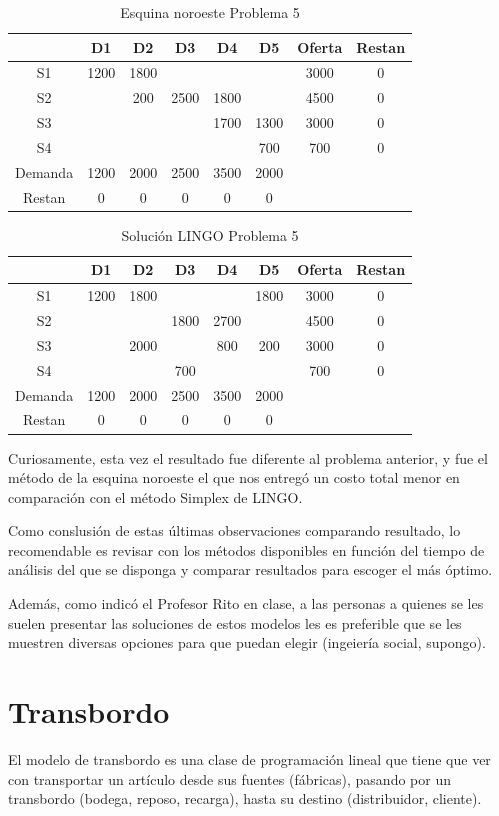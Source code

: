 \documentclass[12pt]{article}  %
\begin{document}
\begin{table}[H]
\centering
\caption{Esquina noroeste Problema 5}
\label{tab:esqNorEstProb5}
\begin{tabular}{c|ccccc|cc}
& D1 & D2 & D3 & D4 & D5 & Oferta & Restan\\
\hline
S1 & 1200 & 1800 &  &  &  & 3000 & 0 \\
S2 &  & 200 & 2500 & 1800 &  & 4500 & 0 \\
S3 &  &  &  & 1700 & 1300 & 3000 & 0 \\
S4 &  &  &  &  & 700 & 700 &0 \\
\hline
Demanda & 1200 & 2000 & 2500 & 3500 & 2000 & & \\
Restan & 0 & 0 & 0 & 0 & 0 &&
\end{tabular}
\end{table}

\begin{table}[H]
\centering
\caption{Solución LINGO Problema 5}
\label{tab:solLingoProb5}
\begin{tabular}{c|ccccc|cc}
& D1 & D2 & D3 & D4 & D5 & Oferta & Restan\\
\hline
S1 & 1200 & 1800 &  &  & 1800 & 3000 & 0 \\
S2 &  &  & 1800 & 2700 &  & 4500 & 0 \\
S3 &  & 2000 &  & 800 & 200 & 3000 & 0 \\
S4 &  &  & 700 &  &  & 700 &0 \\
\hline
Demanda & 1200 & 2000 & 2500 & 3500 & 2000 & & \\
Restan & 0 & 0 & 0 & 0 & 0 &&
\end{tabular}
\end{table}

Curiosamente, esta vez el resultado fue diferente al problema anterior, y fue el método de la esquina noroeste el que nos entregó un costo total menor en comparación con el método Simplex de LINGO.

Como conslusión de estas últimas observaciones comparando resultado, lo recomendable es revisar con los métodos disponibles en función del tiempo de análisis del que se disponga y comparar resultados para escoger el más óptimo.

Además, como indicó el Profesor Rito en clase, a las personas a quienes se les suelen presentar las soluciones de estos modelos les es preferible que se les muestren diversas opciones para que puedan elegir (ingeiería social, supongo).

\section{Transbordo}
El modelo de transbordo es una clase de programación lineal que tiene que ver con transportar un artículo desde sus fuentes (fábricas), pasando por un transbordo (bodega, reposo, recarga), hasta su destino (distribuidor, cliente).
\end{document}
